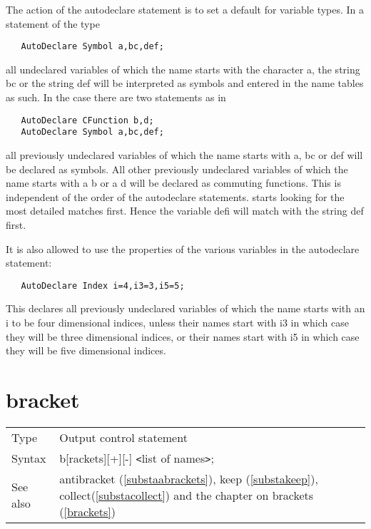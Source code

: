 

\noindent The action of the autodeclare statement is to set a default for 
variable types. In a statement of the type
\begin{verbatim}
   AutoDeclare Symbol a,bc,def;
\end{verbatim}
all undeclared variables of which the name starts with the character a, the 
string bc or the string def will be interpreted as symbols and entered in 
the name tables as such. In the case there are two statements as in
\begin{verbatim}
   AutoDeclare CFunction b,d;
   AutoDeclare Symbol a,bc,def;
\end{verbatim}
all previously undeclared variables of which the name starts with a, bc or 
def will be declared as symbols. All other previously undeclared variables 
of which the name starts with a b or a d will be declared as commuting 
functions. This is independent of the order of the autodeclare statements. 
{\FORM} starts looking for the most detailed matches 
first. Hence the variable defi will match with the string def first.
\vspace{4mm}

\noindent It is also allowed to use the properties of the various variables 
in the autodeclare statement:
\begin{verbatim}
   AutoDeclare Index i=4,i3=3,i5=5;
\end{verbatim}
This declares all previously undeclared variables of which the name starts 
with an i to be four dimensional indices, unless their names start with i3 in 
which case they will be three dimensional indices, or their names start 
with i5 in which case they will be five dimensional indices. \vspace{10mm}


\section{bracket}
\label{substabracket}

\noindent \begin{tabular}{ll}
Type & Output control statement\\
Syntax & b[rackets][+][-] {\tt<}list of names{\tt>}; \\
See also & antibracket (\ref{substaabrackets}), keep (\ref{substakeep}),
    collect(\ref{substacollect}) and the chapter on brackets 
     (\ref{brackets})
\end{tabular} \vspace{4mm}


